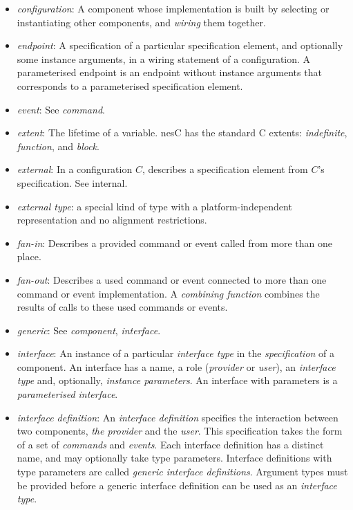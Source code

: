 \documentclass[11pt,letterpaper]{article}
\newcommand{\nesc}{nesC\xspace}
\begin{document}
\begin{itemize}
\item \emph{configuration}: A component whose implementation is built by
selecting or instantiating other components, and \emph{wiring} them
together.

\item \emph{endpoint}: A specification of a particular specification
element, and optionally some instance arguments, in a wiring
statement of a configuration. A parameterised endpoint is an endpoint
without instance arguments that corresponds to a parameterised specification
element.

\item \emph{event}: See \emph{command}.

\item \emph{extent}: The lifetime of a variable. \nesc has the standard C
extents: \emph{indefinite}, \emph{function}, and \emph{block}.

\item \emph{external}: In a configuration $C$, describes a specification
element from $C$'s specification. See internal.

\item \emph{external type}: a special kind of type with a
platform-independent representation and no alignment restrictions.

\item \emph{fan-in}: Describes a provided command or event called from more
than one place.

\item \emph{fan-out}: Describes a used command or event connected to more
than one command or event implementation. A \emph{combining function}
combines the results of calls to these used commands or events.

\item \emph{generic}: See \emph{component}, \emph{interface}.

\item \emph{interface}: An instance of a particular \emph{interface type}
in the \emph{specification} of a component. An interface has a name, a role
(\emph{provider} or \emph{user}), an \emph{interface type} and, optionally,
\emph{instance parameters}. An interface with parameters is a
\emph{parameterised interface}.

\item \emph{interface definition}: An \emph{interface definition} specifies
the interaction between two components, \emph{the provider} and the
\emph{user}. This specification takes the form of a set of \emph{commands}
and \emph{events}. Each interface definition has a distinct name, and may
optionally take type parameters. Interface definitions with type parameters
are called \emph{generic interface definitions}. Argument types must be
provided before a generic interface definition can be used as an 
\emph{interface type}.


\end{itemize}
\end{document}
